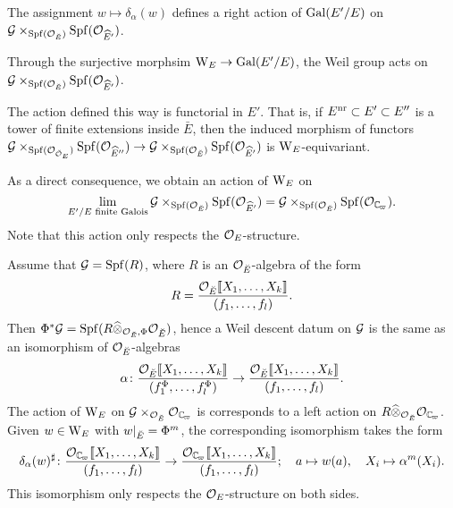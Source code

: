 \documentclass[../main.tex]{subfiles}
\begin{document}
\begin{lem}\label{lem:WeilDDIndAction}
  The assignment $w \mapsto \delta_\alpha(w)$ defines a right action 
  of $\operatorname{Gal}(E'/E)$ on $\mathcal{G} \times_{\operatorname{Spf}(\mathcal{O}_{\breve {E}})}\operatorname{Spf}(\mathcal{O}_{\widehat E'})$.
\end{lem}

Through the surjective morphsim $\mathrm W_E \to \operatorname{Gal}(E'/E)$, the Weil group acts
on $\mathcal{G} \times_{\operatorname{Spf}(\mathcal{O}_{\breve {E}})}\operatorname{Spf}(\mathcal{O}_{\widehat E'})$.

\begin{lem}\label{lem:WeilGroupActionIsFunctorialInE}
  The action defined this way is functorial in $E'$. That is, 
  if $E^{\mathrm{nr}} \subset E' \subset E''$ is a
  tower of finite extensions inside $\bar E$, then the induced morphism of
  functors 
  $\mathcal{G} \times_{\operatorname{Spf}(\mathcal{O}_{{\breve {\mathcal{O}}}_E})} \operatorname{Spf}(\mathcal{O}_{\widehat E''}) \to 
  \mathcal{G} \times_{\operatorname{Spf}(\mathcal{O}_{\breve {E}})} \operatorname{Spf}(\mathcal{O}_{\widehat E'})$
  is $\mathrm W_E$-equivariant. 
\end{lem}
As a direct consequence, we obtain an action of $\mathrm W_E$ on
$$\lim_{E'/E \text{ finite Galois}} \cG \times_{\spf(\cO_\br E)} \spf(\cO_{\hat
E'}) = \cG \times_{\spf(\cO_\br E)} \spf(\cO_{\Cp}).$$ Note that this action 
only respects the $\mathcal{O}_E$-structure.

\begin{xpl}
  Assume that $\mathcal{G} = \operatorname{Spf}(R)$, where $R$ is an $\mathcal{O}_{\breve {E}}$-algebra of the form
  \begin{equation*}
    R = \frac{\mathcal{O}_{\breve {E}} \llbracket X_1, \dots, X_k \rrbracket}{(f_1, \dots, f_l)}.
  \end{equation*}
  Then $\Phi^*\mathcal{G} = \operatorname{Spf}(R \widehat \otimes_{\mathcal{O}_{\breve {E}}, \Phi} \mathcal{O}_{\breve {E}})$,
  hence a Weil descent datum on $\mathcal{G}$ is the same as an isomorphism
  of $\mathcal{O}_{\breve {E}}$-algebras
  \begin{equation*}
    \alpha\colon 
    \frac{\mathcal{O}_{\breve {E}} \llbracket X_1, \dots, X_k \rrbracket}{(f_1^\Phi, \dots, f_l^\Phi)}
    \to 
    \frac{\mathcal{O}_{\breve {E}} \llbracket X_1, \dots, X_k \rrbracket}{(f_1, \dots, f_l)}.
  \end{equation*}
  The action of $\mathrm W_E$ on $\cG \times_{\cO_\br E} \cO_\Cp$
  is corresponds to a left action on $R \cotimes_{\cO_\br E}\cO_\Cp$.
  Given $w \in \mathrm W_E$ with $w|_{\breve {E}} = \Phi^m$, the corresponding
  isomorphism takes the form
  \begin{equation*}
    \delta_\alpha(w)^\sharp \colon 
    \frac{\cO_\Cp \llbr X_1, \dots, X_k \rrbr}{(f_1, \dots, f_l)} \to 
    \frac{\cO_\Cp \llbr X_1, \dots, X_k \rrbr}{(f_1, \dots, f_l)};
    \quad a \mapsto w(a), \quad X_i \mapsto \alpha^m(X_i).
  \end{equation*}
  This isomorphism only respects the $\mathcal{O}_E$-structure on both sides.
\end{xpl}
\end{document}
